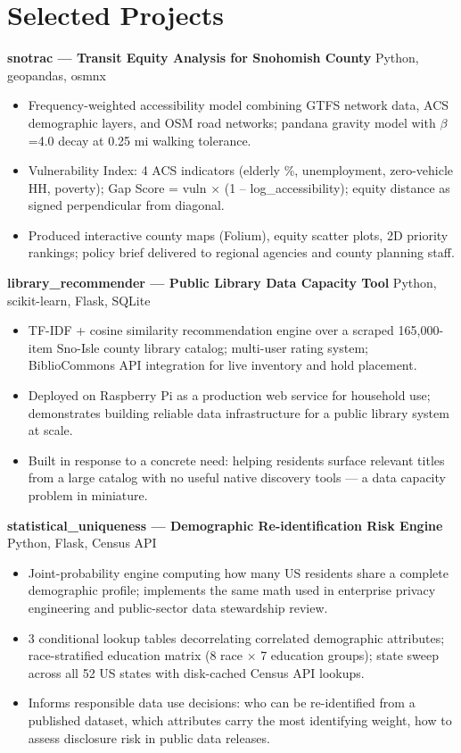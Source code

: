 \documentclass[11pt,a4paper]{article}
\begin{document}
\section*{Selected Projects}

\noindent
\textbf{snotrac --- Transit Equity Analysis for Snohomish County} \hfill Python, geopandas, osmnx
\begin{itemize}
    \item Frequency-weighted accessibility model combining GTFS network data, ACS demographic layers, and OSM road networks; pandana gravity model with $\beta$=4.0 decay at 0.25 mi walking tolerance.
    \item Vulnerability Index: 4 ACS indicators (elderly \%, unemployment, zero-vehicle HH, poverty); Gap Score = vuln $\times$ (1 -- log\_accessibility); equity distance as signed perpendicular from diagonal.
    \item Produced interactive county maps (Folium), equity scatter plots, 2D priority rankings; policy brief delivered to regional agencies and county planning staff.
\end{itemize}

\vspace{0.2cm}
\noindent
\textbf{library\_recommender --- Public Library Data Capacity Tool} \hfill Python, scikit-learn, Flask, SQLite
\begin{itemize}
    \item TF-IDF + cosine similarity recommendation engine over a scraped 165,000-item Sno-Isle county library catalog; multi-user rating system; BiblioCommons API integration for live inventory and hold placement.
    \item Deployed on Raspberry Pi as a production web service for household use; demonstrates building reliable data infrastructure for a public library system at scale.
    \item Built in response to a concrete need: helping residents surface relevant titles from a large catalog with no useful native discovery tools --- a data capacity problem in miniature.
\end{itemize}

\vspace{0.2cm}
\noindent
\textbf{statistical\_uniqueness --- Demographic Re-identification Risk Engine} \hfill Python, Flask, Census API
\begin{itemize}
    \item Joint-probability engine computing how many US residents share a complete demographic profile; implements the same math used in enterprise privacy engineering and public-sector data stewardship review.
    \item 3 conditional lookup tables decorrelating correlated demographic attributes; race-stratified education matrix (8 race $\times$ 7 education groups); state sweep across all 52 US states with disk-cached Census API lookups.
    \item Informs responsible data use decisions: who can be re-identified from a published dataset, which attributes carry the most identifying weight, how to assess disclosure risk in public data releases.
\end{itemize}
\end{document}
